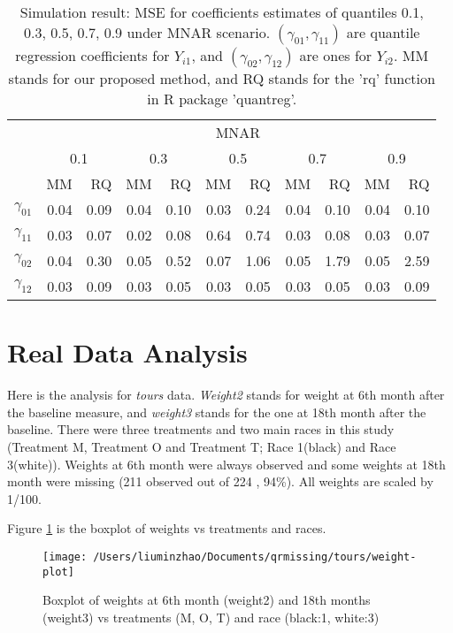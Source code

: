 \documentclass[12pt]{article}
\begin{document}
\begin{table}[h]
  \renewcommand{\arraystretch}{1.3}
  \centering
  \caption{Simulation result: MSE for coefficients estimates of quantiles
    0.1, 0.3, 0.5, 0.7, 0.9 under MNAR scenario. $(\gamma_{01}, \gamma_{11})$ 
    are quantile regression coefficients for $Y_{i1}$, and $(\gamma_{02}, \gamma_{12})$ 
    are ones for $Y_{i2}$. MM stands for our proposed method, and RQ stands for the 'rq' 
    function in R package 'quantreg'.}
  \vspace{10pt}
  \begin{tabular}{rrrrrrrrrrr}
    \toprule
    & \multicolumn{ 10}{c}{MNAR} \\
    \cline{2-11}
    &  \multicolumn{2}{c}{0.1} &  \multicolumn{2}{c}{0.3} &  \multicolumn{2}{c}{0.5} 
    &  \multicolumn{2}{c}{0.7} &  \multicolumn{2}{c}{0.9} \\
    \cline{2-11}
    & MM & RQ    & MM & RQ    & MM & RQ    & MM & RQ    & MM & RQ \\
    \hline
    $\gamma_{01}$ & 0.04 &0.09&0.04 &0.10 &0.03 &0.24 &0.04 &0.10 &0.04 &0.10 \\
    $\gamma_{11}$ & 0.03 &0.07&0.02 &0.08 &0.64 &0.74 &0.03 &0.08 &0.03 &0.07 \\ 
    $\gamma_{02}$ & 0.04 &0.30&0.05 &0.52 &0.07 &1.06 &0.05 &1.79 &0.05 &2.59 \\ 
    $\gamma_{12}$ & 0.03 &0.09&0.03 &0.05 &0.03 &0.05 &0.03 &0.05 &0.03 &0.09 \\ 
    \bottomrule
  \end{tabular}  \label{tab:sim2}
\end{table}


\section{Real Data Analysis}
\label{sec:real}
Here is the analysis for \textit{tours} data. \textit{Weight2} stands
for weight at 6th month after the baseline measure, and
\textit{weight3} stands for the one at 18th month after the
baseline. There were three treatments and two main races in this study
(Treatment M, Treatment O and Treatment T; Race 1(black) and Race
3(white)). Weights at 6th month were always observed and some weights
at 18th month were missing (211 observed out of 224 , 94\%). All
weights are scaled by 1/100.

Figure \ref{fig:tours} is the boxplot of weights vs treatments and
races.

\begin{figure}[htb]
  \centerline{\texttt{[image: /Users/liuminzhao/Documents/qrmissing/tours/weight-plot]}}
  \caption[]{\label{fig:tours} Boxplot of weights at 6th month
    (weight2) and 18th months (weight3) vs treatments (M, O, T) and
    race (black:1, white:3)}
\end{figure}
\end{document}
